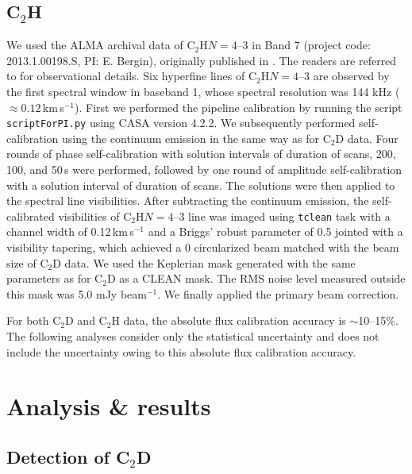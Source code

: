 \documentclass[linenumbers, twocolumn, times]{aastex631}
\newcommand{\CCH}{C$_2$H\xspace}
\newcommand{\CCD}{C$_2$D\xspace}
\begin{document}
\subsection{C$_2$H}
We used the ALMA archival data of \CCH $N=4$--3 in Band 7 (project code: 2013.1.00198.S, PI: E. Bergin), originally published in \citet{Bergin2016}. The readers are referred to \citet{Bergin2016} for observational details. Six hyperfine lines of \CCH $N=4$--3 are observed by the first spectral window in baseband 1, whose spectral resolution was 144 kHz (${\approx}0.12$\,km\,s$^{-1}$). First we performed the pipeline calibration by running the script \texttt{scriptForPI.py} using CASA version 4.2.2. We subsequently performed self-calibration using the continuum emission in the same way as for \CCD data. Four rounds of phase self-calibration with solution intervals of duration of scans, 200, 100, and 50\,s were performed, followed by one round of amplitude self-calibration with a solution interval of duration of scans. The solutions were then applied to the spectral line visibilities. After subtracting the continuum emission, the self-calibrated visibilities of \CCH $N=4$--3 line was imaged using \texttt{tclean} task with a channel width of 0.12\,km\,s$^{-1}$ and a Briggs' robust parameter of 0.5 jointed with a visibility tapering, which achieved a 0 circularized beam matched with the beam size of \CCD data. We used the Keplerian mask generated with the same parameters as for \CCD as a CLEAN mask. The RMS noise level measured outside this mask was 5.0 mJy beam$^{-1}$. We finally applied the primary beam correction.

For both \CCD and \CCH data, the absolute flux calibration accuracy is ${\sim}$10--15\%. The following analyses consider only the statistical uncertainty and does not include the uncertainty owing to this absolute flux calibration accuracy.


\section{Analysis \& results} \label{sec:analysis}

\subsection{Detection of \CCD}
\begin{figure*}
\caption{(a) Velocity-integrated intensity map of \CCH $N=4$--3 lines. }
\label{fig:abundance_comparison}
\end{figure*}
\end{document}

